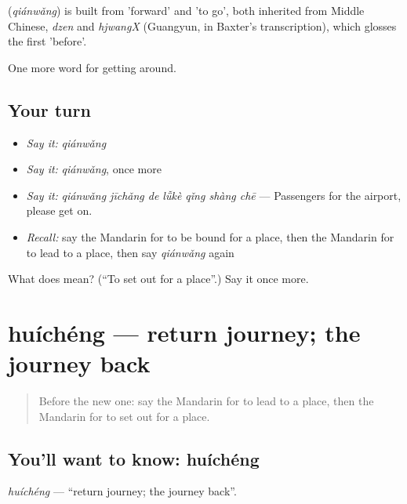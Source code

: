\begin{cousinweb}
\textbf{} (\emph{qiánwǎng}) is built from  'forward' and  'to go', both inherited from Middle Chinese, \emph{dzen} and \emph{hjwangX} (Guangyun, in Baxter's transcription), which glosses the first 'before'.
\end{cousinweb}

\begin{grammarlens}[title={What you've built}]
One more word for getting around.
\end{grammarlens}

\subsection*{Your turn}
\begin{itemize}
\raggedright
  \item \emph{Say it:} \emph{qiánwǎng}
  \item \emph{Say it:} \emph{qiánwǎng}, once more
  \item \emph{Say it:} \emph{qiánwǎng jīchǎng de lǚkè qǐng shàng chē} — Passengers for the airport, please get on.
  \item \emph{Recall:} say the Mandarin for to be bound for a place, then the Mandarin for to lead to a place, then say \emph{qiánwǎng} again
\end{itemize}

\begin{tcolorbox}[breakable,colback=teal!4,colframe=teal!35!black,title={Before you move on}]
What does  mean? (\textquotedblleft{}To set out for a place\textquotedblright{}.) Say it once more.
\end{tcolorbox}
\section[huíchéng]{huíchéng — return journey; the journey back}

\label{lesson:ZH-C428-huicheng}



\begin{quote}
Before the new one: say the Mandarin for to lead to a place, then the Mandarin for to set out for a place.
\end{quote}

\subsection*{You'll want to know: huíchéng}
\emph{huíchéng} — \textquotedblleft{}return journey; the journey back\textquotedblright{}.


